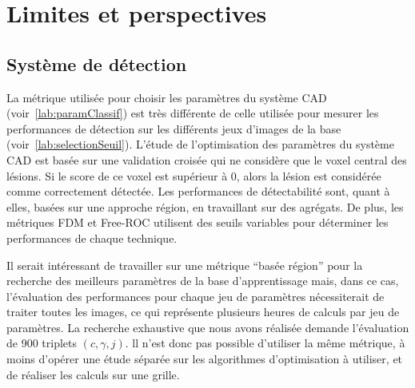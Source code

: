 % 
% 
% 

\section{Limites et perspectives}


\subsection{Système de détection}

La métrique utilisée pour choisir les paramètres du système CAD
(voir~\ref{lab:paramClassif}) est très différente de celle utilisée pour
mesurer les performances de détection sur les différents jeux d'images de la base
(voir~\ref{lab:selectionSeuil}). L'étude de l'optimisation des paramètres du
système CAD est basée sur une validation croisée qui ne considère que le
voxel central des lésions. Si le score de ce voxel est supérieur à 0,
alors la lésion est considérée comme correctement détectée. Les
performances de détectabilité sont, quant à elles, basées sur une approche
région, en travaillant sur des agrégats. De plus, les métriques FDM et
Free-ROC utilisent des seuils variables pour déterminer les performances de chaque
technique. 

Il serait intéressant de travailler sur une métrique ``basée région'' pour la
recherche des meilleurs paramètres de la base d'apprentissage mais, dans ce cas,
l'évaluation des performances pour chaque jeu de paramètres nécessiterait de traiter
toutes les images, ce qui représente plusieurs heures de calculs par jeu de
paramètres. La recherche exhaustive que nous avons réalisée demande l'évaluation
de 900 triplets $(c, \gamma, j)$. ll n'est donc pas possible d'utiliser la même
métrique, à moins d'opérer une étude séparée sur les algorithmes d'optimisation à utiliser, et de
réaliser les calculs sur une grille. 

